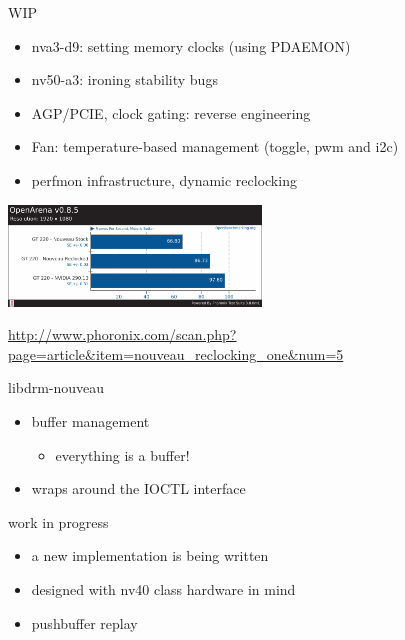 \documentclass[11pt,english,compress]{beamer}
\begin{document}
		\begin{frame}
			\begin{block}{WIP}
				\begin{itemize}
					\item nva3-d9: setting memory clocks (using PDAEMON)
					\item nv50-a3: ironing stability bugs 
					\item AGP/PCIE, clock gating: reverse engineering
					\item Fan: temperature-based management (toggle, pwm and i2c)
					\item perfmon infrastructure, dynamic reclocking
				\end{itemize}
			\end{block}

			\begin{center}
				\includegraphics[height=2.7cm]{imgs/gt220_openarena_bench.pdf}
			\end{center}
			\begin{center}
				\url{http://www.phoronix.com/scan.php?page=article&item=nouveau_reclocking_one&num=5}
			\end{center}

		\end{frame}

		\begin{frame}
			\begin{block}{libdrm-nouveau}
				\begin{itemize}
					\item buffer management
						\begin{itemize}
							\item everything is a buffer!
						\end{itemize}
					\item wraps around the IOCTL interface
				\end{itemize}
			\end{block}
			\begin{block}{work in progress}
				\begin{itemize}
					\item a new implementation is being written
					\item designed with nv40 class hardware in mind
					\item pushbuffer replay
				\end{itemize}
			\end{block}
		\end{frame}
\end{document}
